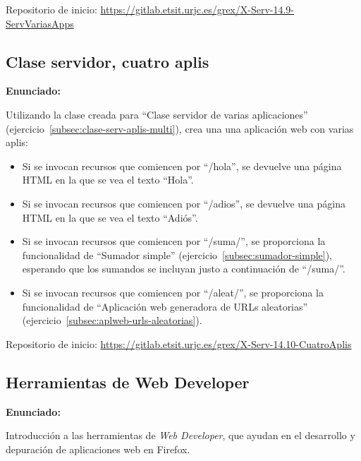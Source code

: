 Repositorio de inicio: \url{https://gitlab.etsit.urjc.es/grex/X-Serv-14.9-ServVariasApps}

\subsection{Clase servidor, cuatro aplis}
\label{subsec:clase-serv-aplis-varias}

\textbf{Enunciado:}

Utilizando la clase creada para ``Clase servidor de varias aplicaciones'' (ejercicio~\ref{subsec:clase-serv-aplis-multi}), crea una una aplicación web con varias aplis:

\begin{itemize}
\item Si se invocan recursos que comiencen por ``/hola'', se devuelve una página HTML en la que se vea el texto ``Hola''.
\item Si se invocan recursos que comiencen por ``/adios'', se devuelve una página HTML en la que se vea el texto ``Adiós''.
\item Si se invocan recursos que comiencen por ``/suma/'', se proporciona la funcionalidad de ``Sumador simple'' (ejercicio~\ref{subsec:sumador-simple}), esperando que los sumandos se incluyan justo a continuación de ``/suma/''.
\item Si se invocan recursos que comiencen por ``/aleat/'', se proporciona la funcionalidad de ``Aplicación web generadora de URLs aleatorias'' (ejercicio~\ref{subsec:aplweb-urls-aleatorias}).
\end{itemize}

Repositorio de inicio: \url{https://gitlab.etsit.urjc.es/grex/X-Serv-14.10-CuatroAplis}

\subsection{Herramientas de Web Developer}
\label{subsec:inst-web-developer}

\textbf{Enunciado:}

Introducción a las herramientas de \emph{Web Developer}, que ayudan en el desarrollo
y depuración de aplicaciones web en Firefox.

